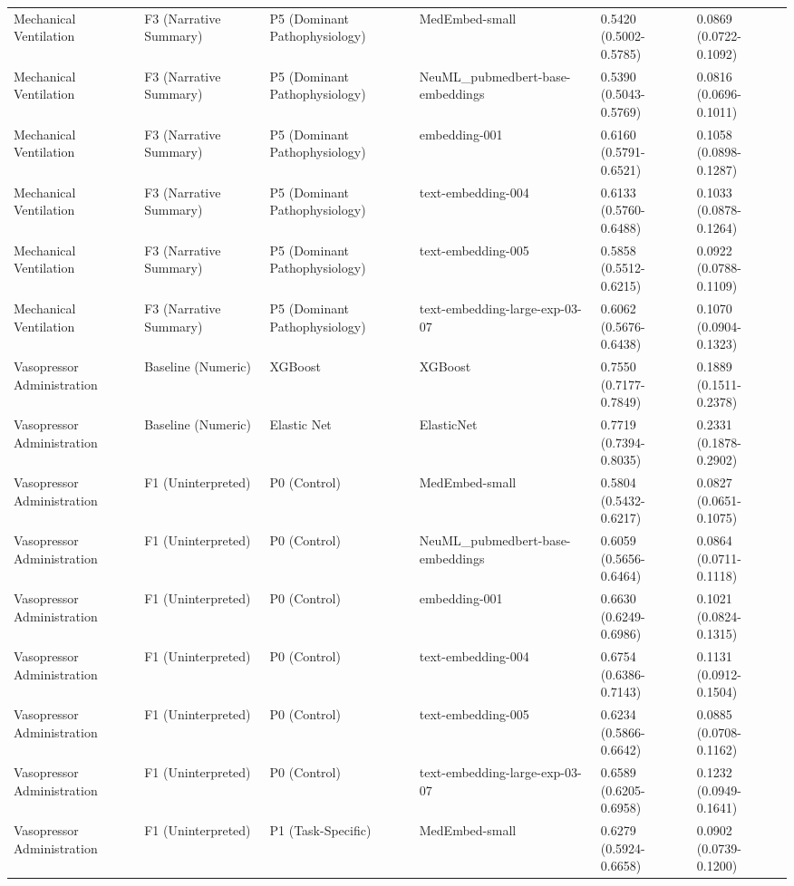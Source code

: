 \begin{tabular}{llllll}
Mechanical Ventilation & F3 (Narrative Summary) & P5 (Dominant Pathophysiology) & MedEmbed-small & 0.5420 (0.5002-0.5785) & 0.0869 (0.0722-0.1092) \\
Mechanical Ventilation & F3 (Narrative Summary) & P5 (Dominant Pathophysiology) & NeuML\_pubmedbert-base-embeddings & 0.5390 (0.5043-0.5769) & 0.0816 (0.0696-0.1011) \\
Mechanical Ventilation & F3 (Narrative Summary) & P5 (Dominant Pathophysiology) & embedding-001 & 0.6160 (0.5791-0.6521) & 0.1058 (0.0898-0.1287) \\
Mechanical Ventilation & F3 (Narrative Summary) & P5 (Dominant Pathophysiology) & text-embedding-004 & 0.6133 (0.5760-0.6488) & 0.1033 (0.0878-0.1264) \\
Mechanical Ventilation & F3 (Narrative Summary) & P5 (Dominant Pathophysiology) & text-embedding-005 & 0.5858 (0.5512-0.6215) & 0.0922 (0.0788-0.1109) \\
Mechanical Ventilation & F3 (Narrative Summary) & P5 (Dominant Pathophysiology) & text-embedding-large-exp-03-07 & 0.6062 (0.5676-0.6438) & 0.1070 (0.0904-0.1323) \\
Vasopressor Administration & Baseline (Numeric) & XGBoost & XGBoost & 0.7550 (0.7177-0.7849) & 0.1889 (0.1511-0.2378) \\
Vasopressor Administration & Baseline (Numeric) & Elastic Net & ElasticNet & 0.7719 (0.7394-0.8035) & 0.2331 (0.1878-0.2902) \\
Vasopressor Administration & F1 (Uninterpreted) & P0 (Control) & MedEmbed-small & 0.5804 (0.5432-0.6217) & 0.0827 (0.0651-0.1075) \\
Vasopressor Administration & F1 (Uninterpreted) & P0 (Control) & NeuML\_pubmedbert-base-embeddings & 0.6059 (0.5656-0.6464) & 0.0864 (0.0711-0.1118) \\
Vasopressor Administration & F1 (Uninterpreted) & P0 (Control) & embedding-001 & 0.6630 (0.6249-0.6986) & 0.1021 (0.0824-0.1315) \\
Vasopressor Administration & F1 (Uninterpreted) & P0 (Control) & text-embedding-004 & 0.6754 (0.6386-0.7143) & 0.1131 (0.0912-0.1504) \\
Vasopressor Administration & F1 (Uninterpreted) & P0 (Control) & text-embedding-005 & 0.6234 (0.5866-0.6642) & 0.0885 (0.0708-0.1162) \\
Vasopressor Administration & F1 (Uninterpreted) & P0 (Control) & text-embedding-large-exp-03-07 & 0.6589 (0.6205-0.6958) & 0.1232 (0.0949-0.1641) \\
Vasopressor Administration & F1 (Uninterpreted) & P1 (Task-Specific) & MedEmbed-small & 0.6279 (0.5924-0.6658) & 0.0902 (0.0739-0.1200) \\

\end{tabular}

